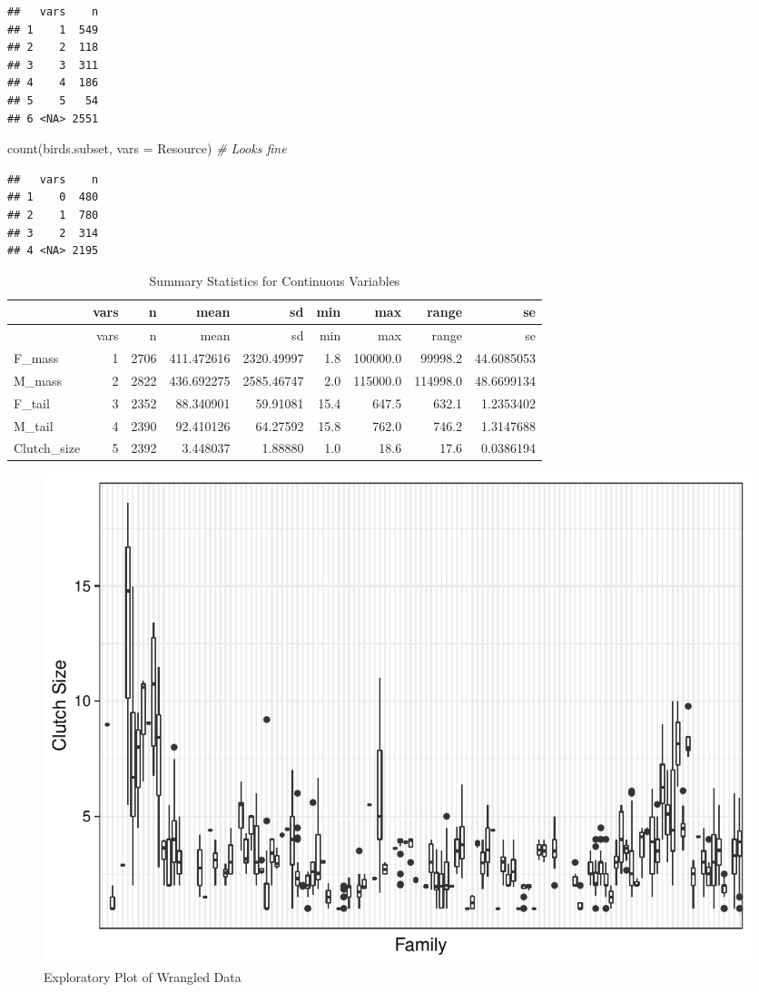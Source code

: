 \documentclass[
  12pt,
]{article}
\newenvironment{Shaded}{\begin{snugshade}}{\end{snugshade}}
\newcommand{\AttributeTok}[1]{\textcolor[rgb]{0.77,0.63,0.00}{#1}}
\newcommand{\CommentTok}[1]{\textcolor[rgb]{0.56,0.35,0.01}{\textit{#1}}}
\newcommand{\FunctionTok}[1]{\textcolor[rgb]{0.00,0.00,0.00}{#1}}
\newcommand{\NormalTok}[1]{#1}
\begin{document}
\begin{verbatim}
##   vars    n
## 1    1  549
## 2    2  118
## 3    3  311
## 4    4  186
## 5    5   54
## 6 <NA> 2551
\end{verbatim}

\begin{Shaded}
\begin{Highlighting}[]
\FunctionTok{count}\NormalTok{(birds.subset, }\AttributeTok{vars =}\NormalTok{ Resource) }\CommentTok{\# Looks fine}
\end{Highlighting}
\end{Shaded}

\begin{verbatim}
##   vars    n
## 1    0  480
## 2    1  780
## 3    2  314
## 4 <NA> 2195
\end{verbatim}

\begin{longtable}[]{@{}lrrrrrrrr@{}}
\caption{Summary Statistics for Continuous Variables}\tabularnewline
\toprule
& vars & n & mean & sd & min & max & range & se \\
\midrule
\endfirsthead
\toprule
& vars & n & mean & sd & min & max & range & se \\
\midrule
\endhead
F\_mass & 1 & 2706 & 411.472616 & 2320.49997 & 1.8 & 100000.0 & 99998.2
& 44.6085053 \\
M\_mass & 2 & 2822 & 436.692275 & 2585.46747 & 2.0 & 115000.0 & 114998.0
& 48.6699134 \\
F\_tail & 3 & 2352 & 88.340901 & 59.91081 & 15.4 & 647.5 & 632.1 &
1.2353402 \\
M\_tail & 4 & 2390 & 92.410126 & 64.27592 & 15.8 & 762.0 & 746.2 &
1.3147688 \\
Clutch\_size & 5 & 2392 & 3.448037 & 1.88880 & 1.0 & 18.6 & 17.6 &
0.0386194 \\
\bottomrule
\end{longtable}

\begin{figure}
\centering
\includegraphics{Project_Code_files/figure-latex/exploratory_plots-1.pdf}
\caption{Exploratory Plot of Wrangled Data}
\end{figure}
\end{document}
